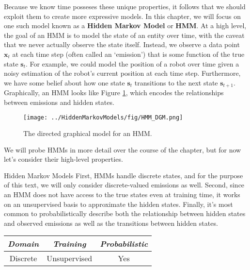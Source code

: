 Because we know time posseses these unique properties, it follows that we should exploit them to create more expressive models. In this chapter, we will focus on one such model known as a \textbf{Hidden Markov Model} or \textbf{HMM}. At a high level, the goal of an HMM is to model the state of an entity over time, with the caveat that we never actually observe the state itself. Instead, we observe a data point $\textbf{x}_t$ at each time step (often called an `emission') that is some function of the true state $\textbf{s}_t$. For example, we could model the position of a robot over time given a noisy estimation of the robot's current position at each time step. Furthermore, we have some belief about how one state $\textbf{s}_t$ transitions to the next state $\textbf{s}_{t+1}$. Graphically, an HMM looks like Figure \ref{fig:HMM-DGM}, which encodes the relationships between emissions and hidden states.

\begin{figure}
    \centering
    \texttt{[image: ../HiddenMarkovModels/fig/HMM\_DGM.png]}
    \caption{The directed graphical model for an HMM.}
    \label{fig:HMM-DGM}
\end{figure}

We will probe HMMs in more detail over the course of the chapter, but for now let's consider their high-level properties.

\begin{mlcube}{Hidden Markov Models}
First, HMMs handle discrete states, and for the purpose of this text, we will only consider discrete-valued emissions as well. Second, since an HMM does not have access to the true states even at training time, it works on an unsupervised basis to approximate the hidden states. Finally, it's most common to probabilistically describe both the relationship between hidden states and observed emissions as well as the transitions between hidden states.
\begin{center}
    \begin{tabular}{c|c|c}
    \textit{\textbf{Domain}} & \textit{\textbf{Training}} & \textit{\textbf{Probabilistic}} \\
    \hline
    Discrete & Unsupervised & Yes \\
    \end{tabular}
\end{center}
\end{mlcube}


